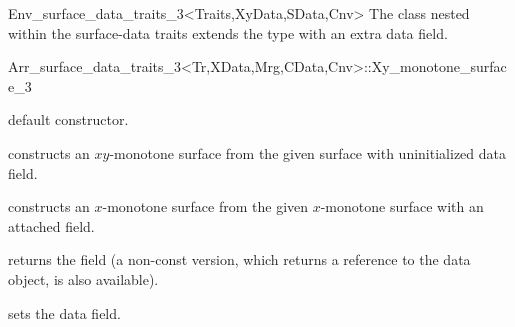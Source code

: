 \begin{ccRefClass}{Env_surface_data_traits_3<Traits,XyData,SData,Cnv>}
The  class nested within the surface-data traits
extends the  type with an extra data
field.

\begin{ccClass}{Arr_surface_data_traits_3<Tr,XData,Mrg,CData,Cnv>::Xy_monotone_surface_3}

\ccInheritsFrom

\ccCreation
{}

    {default constructor.}

    {constructs an $xy$-monotone surface from the given  surface with
     uninitialized data field.}

    {constructs an $x$-monotone surface from the given  $x$-monotone
     surface with an attached  field.}

\ccAccessFunctions

  {returns the field (a non-const version, which returns a reference
   to the data object, is also available).}

  {sets the data field.}

\end{ccClass}

\end{ccRefClass}

\ccRefPageEnd
